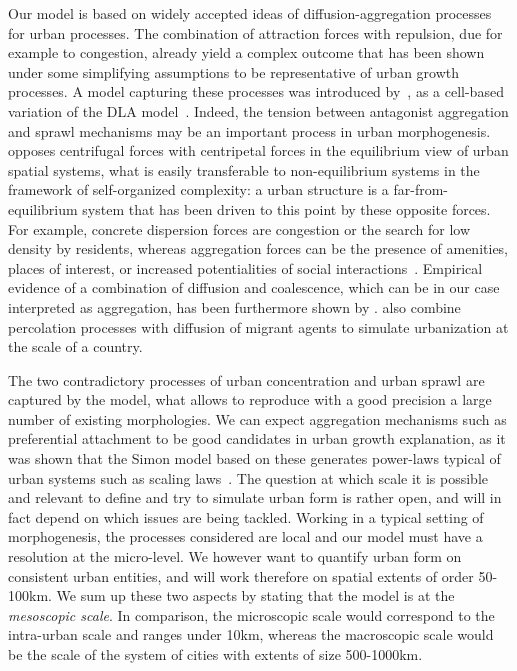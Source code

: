 \documentclass[10pt,letterpaper]{article}
\begin{document}
Our model is based on widely accepted ideas of diffusion-aggregation processes for urban processes. The combination of attraction forces with repulsion, due for example to congestion, already yield a complex outcome that has been shown under some simplifying assumptions to be representative of urban growth processes. A model capturing these processes was introduced by~\cite{batty2006hierarchy}, as a cell-based variation of the DLA model~\cite{batty1991generating}. Indeed, the tension between antagonist aggregation and sprawl mechanisms may be an important process in urban morphogenesis. \cite{fujita1996economics} opposes centrifugal forces with centripetal forces in the equilibrium view of urban spatial systems, what is easily transferable to non-equilibrium systems in the framework of self-organized complexity: a urban structure is a far-from-equilibrium system that has been driven to this point by these opposite forces. For example, concrete dispersion forces are congestion or the search for low density by residents, whereas aggregation forces can be the presence of amenities, places of interest, or increased potentialities of social interactions~\cite{krugman1992dynamic}. Empirical evidence of a combination of diffusion and coalescence, which can be in our case interpreted as aggregation, has been furthermore shown by \cite{dietzel2005diffusion}. \cite{10.1371/journal.pone.0133780} also combine percolation processes with diffusion of migrant agents to simulate urbanization at the scale of a country.

The two contradictory processes of urban concentration and urban sprawl are captured by the model, what allows to reproduce with a good precision a large number of existing morphologies. We can expect aggregation mechanisms such as preferential attachment to be good candidates in urban growth explanation, as it was shown that the Simon model based on these generates power-laws typical of urban systems such as scaling laws~\cite{dodds2017simon}. The question at which scale it is possible and relevant to define and try to simulate urban form is rather open, and will in fact depend on which issues are being tackled. Working in a typical setting of morphogenesis, the processes considered are local and our model must have a resolution at the micro-level. We however want to quantify urban form on consistent urban entities, and will work therefore on spatial extents of order 50-100km. We sum up these two aspects by stating that the model is at the \emph{mesoscopic scale}. In comparison, the microscopic scale would correspond to the intra-urban scale and ranges under 10km, whereas the macroscopic scale would be the scale of the system of cities with extents of size 500-1000km.
\end{document}
